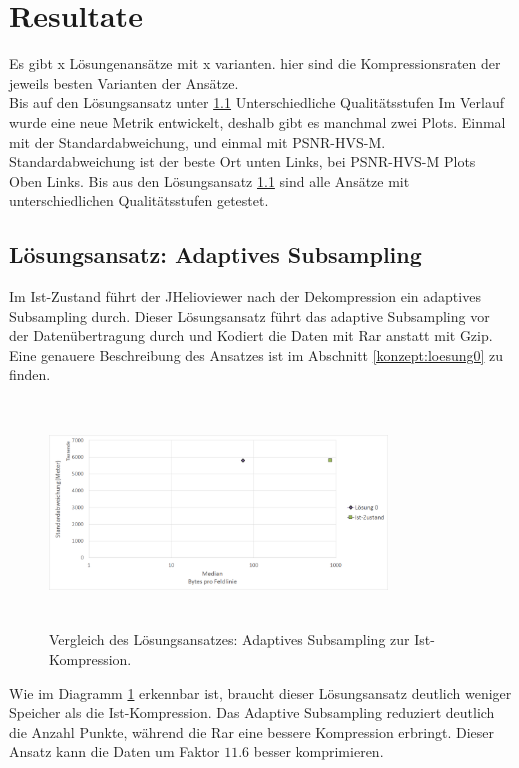 \section{Resultate}\label{resultate}
Es gibt x Lösungenansätze mit x varianten.  hier sind die Kompressionsraten der jeweils besten Varianten der Ansätze.\\
Bis auf den Lösungsansatz unter \ref{resultate:loesung0} Unterschiedliche Qualitätsstufen
Im Verlauf wurde eine neue Metrik entwickelt, deshalb gibt es manchmal zwei Plots. Einmal mit der Standardabweichung, und einmal mit PSNR-HVS-M. Standardabweichung ist der beste Ort unten Links, bei PSNR-HVS-M Plots Oben Links. Bis aus den Lösungsansatz \ref{resultate:loesung0} sind alle Ansätze mit unterschiedlichen Qualitätsstufen getestet.

\subsection{Lösungsansatz: Adaptives Subsampling} \label{resultate:loesung0}
Im Ist-Zustand führt der JHelioviewer nach der Dekompression ein adaptives Subsampling durch. Dieser Lösungsansatz führt das adaptive Subsampling vor der Datenübertragung durch und Kodiert die Daten mit Rar anstatt mit Gzip. Eine genauere Beschreibung des Ansatzes ist im Abschnitt \ref{konzept:loesung0} zu finden.
\begin{figure}[!htbp]
	\center
	\includegraphics[width=0.8\textwidth,height=6cm,keepaspectratio]{./pictures/resultate/loesung0/loesung0_0.png}
	\caption{Vergleich des Lösungsansatzes: Adaptives Subsampling zur Ist-Kompression.}
	\label{resultate:loesung0:loesung0_0}
\end{figure}
Wie im Diagramm \ref{resultate:loesung0:loesung0_0} erkennbar ist, braucht dieser Lösungsansatz deutlich weniger Speicher als die Ist-Kompression. Das Adaptive Subsampling reduziert deutlich die Anzahl Punkte, während die Rar eine bessere Kompression erbringt. Dieser Ansatz kann die Daten um Faktor $11.6$ besser komprimieren.\\
